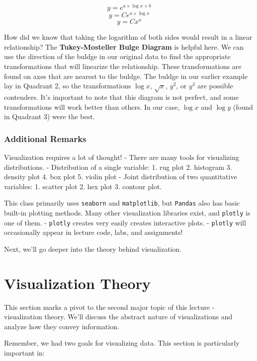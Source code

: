 \documentclass[
  letterpaper,
  DIV=11,
  numbers=noendperiod]{scrreprt}
\begin{document}
\[y= e^{a\times\log x + b}\] \[y= Ce^{a\times\log x}\] \[y= Cx^{a}\]

How did we know that taking the logarithm of both sides would result in
a linear relationship? The \textbf{Tukey-Mosteller Bulge Diagram} is
helpful here. We can use the direction of the buldge in our original
data to find the appropriate transformations that will linearize the
relationship. These transformations are found on axes that are nearest
to the buldge. The buldge in our earlier example lay in Quadrant 2, so
the transformations \(\log x\), \(\sqrt x\), \(y^{2}\), or \(y^{3}\) are
possible contenders. It's important to note that this diagram is not
perfect, and some transformations will work better than others. In our
case, \(\log x\) and \(\log y\) (found in Quadrant 3) were the best.

\hypertarget{additional-remarks}{%
\subsubsection{Additional Remarks}\label{additional-remarks}}

Visualization requires a lot of thought! - There are many tools for
visualizing distributions. - Distribution of a single variable: 1. rug
plot 2. histogram 3. density plot 4. box plot 5. violin plot - Joint
distribution of two quantitative variables: 1. scatter plot 2. hex plot
3. contour plot.

This class primarily uses \texttt{seaborn} and \texttt{matplotlib}, but
\texttt{Pandas} also has basic built-in plotting methods. Many other
visualization libraries exist, and \texttt{plotly} is one of them. -
\texttt{plotly} creates very easily creates interactive plots. -
\texttt{plotly} will occasionally appear in lecture code, labs, and
assignments!

Next, we'll go deeper into the theory behind visualization.

\hypertarget{visualization-theory}{%
\section{Visualization Theory}\label{visualization-theory}}

This section marks a pivot to the second major topic of this lecture -
visualization theory. We'll discuss the abstract nature of
visualizations and analyze how they convey information.

Remember, we had two goals for visualizing data. This section is
particularly important in:
\end{document}
